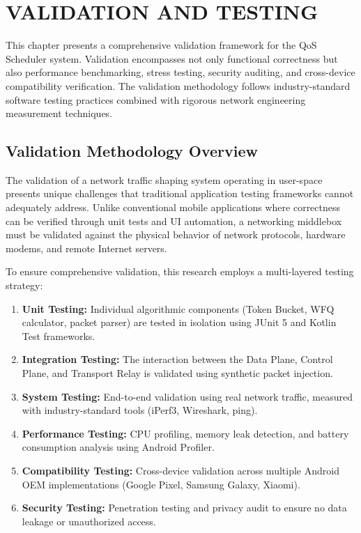 
\chapter{VALIDATION AND TESTING}
\label{chap:validation}

This chapter presents a comprehensive validation framework for the QoS Scheduler system. Validation encompasses not only functional correctness but also performance benchmarking, stress testing, security auditing, and cross-device compatibility verification. The validation methodology follows industry-standard software testing practices combined with rigorous network engineering measurement techniques.

\section{Validation Methodology Overview}
\label{sec:validation_methodology}

The validation of a network traffic shaping system operating in user-space presents unique challenges that traditional application testing frameworks cannot adequately address. Unlike conventional mobile applications where correctness can be verified through unit tests and UI automation, a networking middlebox must be validated against the physical behavior of network protocols, hardware modems, and remote Internet servers.

To ensure comprehensive validation, this research employs a multi-layered testing strategy:

\begin{enumerate}
    \item \textbf{Unit Testing:} Individual algorithmic components (Token Bucket, WFQ calculator, packet parser) are tested in isolation using JUnit 5 and Kotlin Test frameworks.
    \item \textbf{Integration Testing:} The interaction between the Data Plane, Control Plane, and Transport Relay is validated using synthetic packet injection.
    \item \textbf{System Testing:} End-to-end validation using real network traffic, measured with industry-standard tools (iPerf3, Wireshark, ping).
    \item \textbf{Performance Testing:} CPU profiling, memory leak detection, and battery consumption analysis using Android Profiler.
    \item \textbf{Compatibility Testing:} Cross-device validation across multiple Android OEM implementations (Google Pixel, Samsung Galaxy, Xiaomi).
    \item \textbf{Security Testing:} Penetration testing and privacy audit to ensure no data leakage or unauthorized access.
\end{enumerate}

